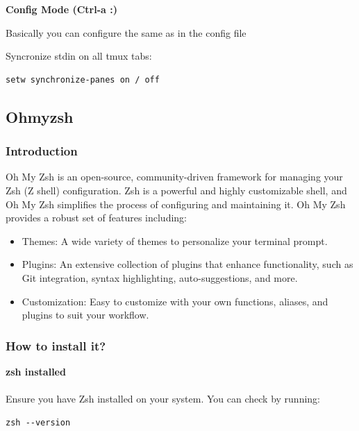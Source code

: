 \documentclass{article}
\newenvironment{codetemplate}[1][]{%
  \mybasecolorbox[#1]
  \itshape
}{%
  \endmybasecolorbox
}
\begin{document}
\textbf{Config Mode (Ctrl-a :)}

Basically you can configure the same as in the config file

Syncronize stdin on all tmux tabs:
\begin{codetemplate}
\begin{verbatim}
setw synchronize-panes on / off
\end{verbatim}
\end{codetemplate}


\subsection{Ohmyzsh}

\subsubsection{Introduction}

Oh My Zsh is an open-source, community-driven framework for managing your Zsh (Z shell) configuration. Zsh is a powerful and highly customizable shell, and Oh My Zsh simplifies the process of configuring and maintaining it. Oh My Zsh provides a robust set of features including:

\begin{itemize}
    \item Themes: A wide variety of themes to personalize your terminal prompt.
    \item Plugins: An extensive collection of plugins that enhance functionality, such as Git integration, syntax highlighting, auto-suggestions, and more.
    \item Customization: Easy to customize with your own functions, aliases, and plugins to suit your workflow.
\end{itemize}

\subsubsection{How to install it?}

\textbf{zsh installed}
\\\\
Ensure you have Zsh installed on your system. You can check by running:
\begin{codetemplate}
\begin{verbatim}
zsh --version
\end{verbatim}
\end{codetemplate}
\end{document}
